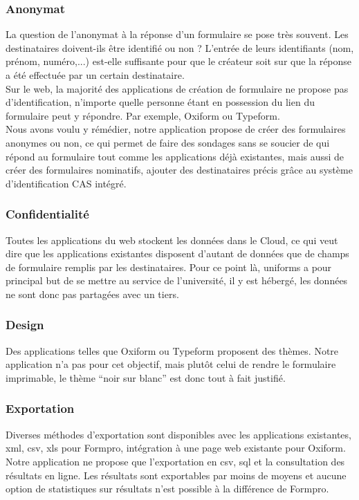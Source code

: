 \documentclass{sigplanconf}
\begin{document}
\subsubsection{Anonymat}
La question de l’anonymat à la réponse d’un formulaire se pose très souvent. Les destinataires doivent-ils être identifié ou non ? L’entrée de leurs identifiants (nom, prénom, numéro,...) est-elle suffisante pour que le créateur soit sur que la réponse a été effectuée par un certain destinataire.\\
Sur le web, la majorité des applications de création de formulaire ne propose pas d’identification, n’importe quelle personne étant en possession du lien du formulaire peut y répondre. Par exemple, Oxiform ou Typeform. \\
Nous avons voulu y rémédier, notre application propose de créer des formulaires anonymes ou non, ce qui permet de faire des sondages sans se soucier de qui répond au formulaire tout comme les applications déjà existantes, mais aussi de créer des formulaires nominatifs, ajouter des destinataires précis grâce au système d’identification CAS intégré.
\subsubsection{Confidentialité}
Toutes les applications du web stockent les données dans le Cloud, ce qui veut dire que les applications existantes disposent d’autant de données que de champs de formulaire remplis par les destinataires. Pour ce point là, uniforms a pour principal but de se mettre au service de l’université, il y est hébergé, les données ne sont donc pas partagées avec un tiers.
\subsubsection{Design}
Des applications telles que Oxiform ou Typeform proposent des thèmes. Notre application n’a pas pour cet objectif, mais plutôt celui de rendre le formulaire imprimable, le thème “noir sur blanc” est donc tout à fait justifié.
\subsubsection{Exportation}
Diverses méthodes d’exportation sont disponibles avec les applications existantes, xml, csv, xls pour Formpro, intégration à une page web existante pour Oxiform. Notre application ne propose que l’exportation en csv, sql et la consultation des résultats en ligne. Les résultats sont exportables par moins de moyens et aucune option de statistiques sur résultats n’est possible à la différence de Formpro.
\end{document}
